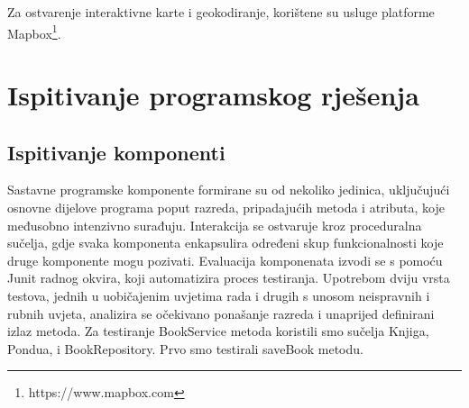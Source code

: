 Za ostvarenje interaktivne karte i geokodiranje, korištene su usluge platforme Mapbox\footnote{https://www.mapbox.com}.
			
			\eject 
		
	
		\section{Ispitivanje programskog rješenja}
			
			
			
			 
			
			\subsection{Ispitivanje komponenti}
			     Sastavne programske komponente formirane su od nekoliko jedinica, uključujući osnovne dijelove programa poput razreda, pripadajućih metoda i atributa, koje međusobno intenzivno surađuju. Interakcija se ostvaruje kroz proceduralna sučelja, gdje svaka komponenta enkapsulira određeni skup funkcionalnosti koje druge komponente mogu pozivati. Evaluacija komponenata izvodi se s pomoću Junit radnog okvira, koji automatizira proces testiranja. Upotrebom dviju vrsta testova, jednih u uobičajenim uvjetima rada i drugih s unosom neispravnih i rubnih uvjeta, analizira se očekivano ponašanje razreda i unaprijed definirani izlaz metoda.
            Za testiranje BookService metoda koristili smo sučelja Knjiga, Pondua, i BookRepository. Prvo smo testirali saveBook metodu.
